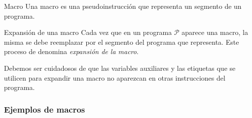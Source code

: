 \begin{definicion}{Macro}{}
    Una macro es una pseudoinstrucción que representa un segmento de 
    un programa.
\end{definicion}

\medskip

\begin{definicion}{Expansión de una macro}{}
    Cada vez que en un programa $\mathcal{P}$ aparece una macro, la misma se 
    debe reemplazar por el segmento del programa que representa.
    Este proceso de denomina \textit{expansión de la macro}.
\end{definicion}

Debemos ser cuidadosos de que las variables auxiliares y las etiquetas que
se utilicen para expandir una macro no aparezcan en otras instrucciones del
programa.

\subsubsection{Ejemplos de macros}

